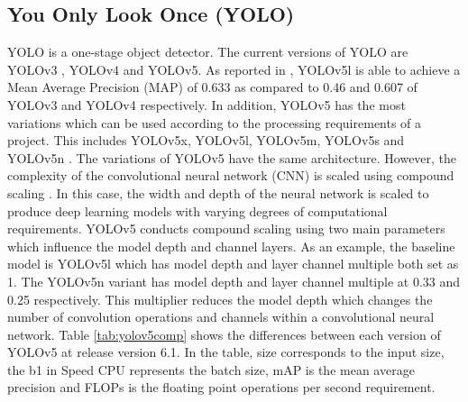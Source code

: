 \documentclass[12pt,a4paper,fleqn]{report}
\begin{document}
\subsection{You Only Look Once (YOLO)}
YOLO is a one-stage object detector.
The current versions of YOLO are YOLOv3 \cite{yolov3:2018}, YOLOv4 \cite{yolov4:2020} and YOLOv5.
As reported in \cite{compareyolo345:2022}, YOLOv5l is able to achieve a Mean Average Precision (MAP) of 0.633 as compared to 0.46 and 0.607 of YOLOv3 and YOLOv4 respectively.
In addition, YOLOv5 has the most variations which can be used according to the processing requirements of a
project.
This includes YOLOv5x, YOLOv5l, YOLOv5m, YOLOv5s and YOLOv5n \cite{yolov5git:2022}.
The variations of YOLOv5 have the same architecture.
However, the complexity of the convolutional neural network (CNN) is scaled using compound scaling
\cite{efficentdet:2019,efficientnet:2019}.
In this case, the width and depth of the neural network is scaled to produce deep learning models
with varying degrees of computational requirements.
YOLOv5 conducts compound scaling using two main parameters which influence the model depth and
channel layers.
As an example, the baseline model is YOLOv5l which has model depth and layer channel multiple both set as
1.
The YOLOv5n variant has model depth and layer channel multiple at 0.33 and 0.25 respectively.
This multiplier reduces the model depth which changes the number of convolution operations and
channels within a convolutional neural network.
Table \ref{tab:yolov5comp} shows the differences between each version of YOLOv5 at release version 6.1.
In the table, size corresponds to the input size, the b1 in Speed CPU represents the batch size, mAP is the mean average precision and FLOPs is the
floating point operations per second requirement.
\end{document}
